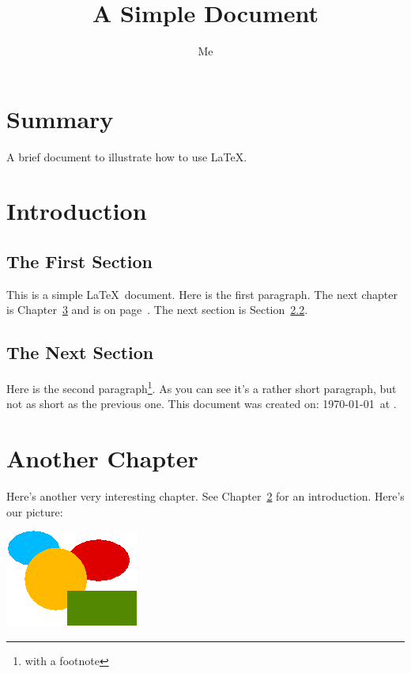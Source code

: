 \documentclass[12pt]{scrbook}
\begin{document}
\title{A Simple Document}
\author{Me}

\maketitle

\frontmatter
\tableofcontents

\chapter{Summary}
A brief document to
illustrate how to use \LaTeX.

\mainmatter
\chapter{Introduction}
\label{ch:intro}

\section{The First Section}

This is a simple \LaTeX\ document.
Here is the first paragraph.
The next chapter is Chapter~\ref{ch:another}
and is on page~\pageref{ch:another}.
The next section is Section~\ref{sec:next}.

\section{The Next Section}
\label{sec:next}

Here is the second paragraph\footnote{with a footnote}. 
As you can see it's a rather short paragraph, but not 
as short as the previous one. This document was 
created on: \today\ at \currenttime.

\chapter{Another Chapter}
\label{ch:another}

Here's another very interesting chapter.
See Chapter~\ref{ch:intro} for an 
introduction.  Here's our picture:

\includegraphics{shapes}
\end{document}
